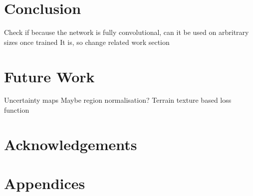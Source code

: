 \documentclass[twocolumn]{article}
\begin{document}
\section{Conclusion}
\label{sec:org56b5d6e}
Check if because the network is fully convolutional, can it be used on arbritrary sizes once trained
It is, so change related work section


\section{Future Work}
\label{sec:org37b418b}

Uncertainty maps
Maybe region normalisation?\autocite{yuRegionNormalizationImage2023}
Terrain texture based loss function

\section*{Acknowledgements}

\printbibliography

\section*{Appendices}
\end{document}
